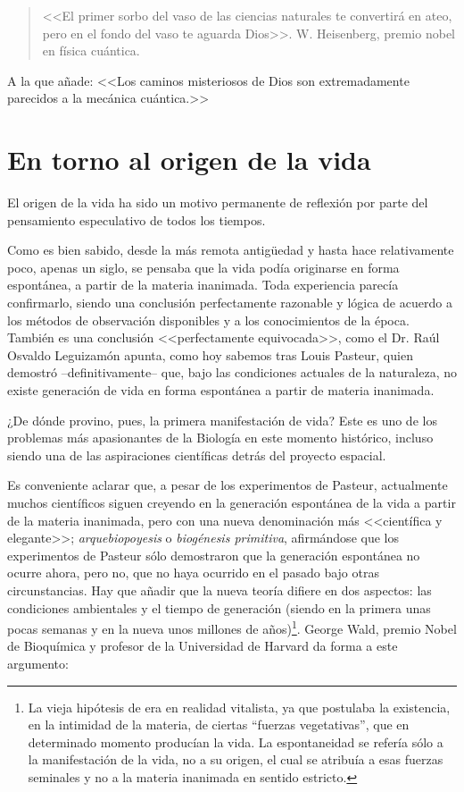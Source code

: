 \documentclass[11pt, oneside, titlepage]{book}
\begin{document}
        \begin{quotation}
            \small <<El primer sorbo del vaso de las ciencias naturales te convertirá en ateo, 
            pero en el fondo del vaso te aguarda Dios>>. W. Heisenberg, premio nobel en física 
            cuántica.
        \end{quotation}

        A la que añade: <<Los caminos misteriosos de Dios son extremadamente parecidos a la 
        mecánica cuántica.>>

\chapter{En torno al origen de la vida}

    El origen de la vida ha sido un motivo permanente de reflexión por parte del pensamiento especulativo 
    de todos los tiempos.
    
    Como es bien sabido, desde la más remota antigüedad y hasta hace relativamente poco, apenas un siglo, 
    se pensaba que la vida podía originarse en forma espontánea, a partir de la materia inanimada. Toda 
    experiencia parecía confirmarlo, siendo una conclusión perfectamente razonable y lógica de acuerdo a 
    los métodos de observación disponibles y a los conocimientos de la época. También es una conclusión 
    <<perfectamente equivocada>>, como el Dr. Raúl Osvaldo Leguizamón apunta, como hoy sabemos tras Louis 
    Pasteur, quien demostró --definitivamente-- que, bajo las condiciones actuales de la naturaleza, no 
    existe generación de vida en forma espontánea a partir de materia inanimada.

    ¿De dónde provino, pues, la primera manifestación de vida? Este es uno de los problemas más apasionantes 
    de la Biología en este momento histórico, incluso siendo una de las aspiraciones científicas detrás del 
    proyecto espacial.

    Es conveniente aclarar que, a pesar de los experimentos de Pasteur, actualmente muchos científicos
    siguen creyendo en la generación espontánea de la vida a partir de la materia inanimada, pero con una 
    nueva denominación más <<científica y elegante>>; \textit{arquebiopoyesis} o \textit{biogénesis primitiva}, 
    afirmándose que los experimentos de Pasteur sólo demostraron que la generación espontánea no ocurre ahora,
    pero no, que no haya ocurrido en el pasado bajo otras circunstancias. Hay que añadir que la nueva teoría
    difiere en dos aspectos: las condiciones ambientales y el tiempo de generación (siendo en la primera unas 
    pocas semanas y en la nueva unos millones de años)\footnote{
        La vieja hipótesis de era en realidad vitalista, ya que postulaba la existencia, en la intimidad de la materia, 
        de ciertas “fuerzas vegetativas”, que en determinado momento producían la vida. La
        espontaneidad se refería sólo a la manifestación de la vida, no a su origen, el cual se atribuía a esas fuerzas
        seminales y no a la materia inanimada en sentido estricto.    
    }. George Wald, premio Nobel de 
    Bioquímica y profesor de la Universidad de Harvard da forma a este argumento:
\end{document}
